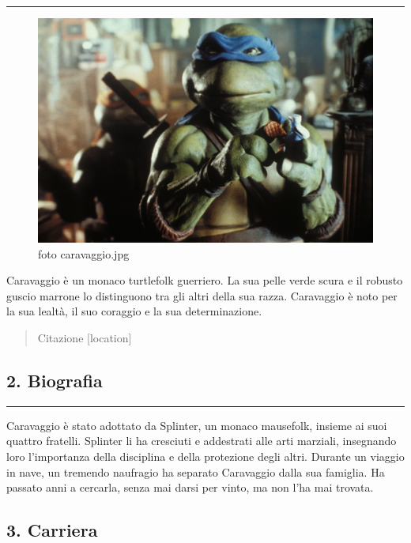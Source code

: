 \begin{center}\rule{0.5\linewidth}{0.5pt}\end{center}

\begin{figure}
\centering
\includegraphics{foto_caravaggio.jpg}
\caption{foto caravaggio.jpg}
\end{figure}

Caravaggio è un monaco turtlefolk guerriero. La sua pelle verde scura e
il robusto guscio marrone lo distinguono tra gli altri della sua razza.
Caravaggio è noto per la sua lealtà, il suo coraggio e la sua
determinazione.

\begin{quote}
Citazione {[}location{]}
\end{quote}

\subsection{2. Biografia}\label{biografia}

\begin{center}\rule{0.5\linewidth}{0.5pt}\end{center}

Caravaggio è stato adottato da Splinter, un monaco mausefolk, insieme ai
suoi quattro fratelli. Splinter li ha cresciuti e addestrati alle arti
marziali, insegnando loro l'importanza della disciplina e della
protezione degli altri. Durante un viaggio in nave, un tremendo
naufragio ha separato Caravaggio dalla sua famiglia. Ha passato anni a
cercarla, senza mai darsi per vinto, ma non l'ha mai trovata.

\subsection{3. Carriera}\label{carriera}

